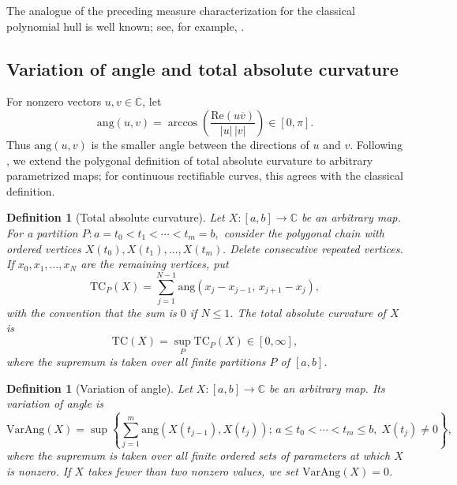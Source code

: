 \documentclass[10pt,a4paper]{amsart}
\newtheorem{definition}[theorem]{Definition}
\newcommand{\C}{\mathbb{C}}
\newcommand{\ang}{\mathrm{ang}}
\newcommand{\T}{\mathrm{TC}}
\newcommand{\VA}{\mathrm{VarAng}}
\newcommand\Real{\mathrm{Re}}
\numberwithin{equation}{section}
\begin{document}
The analogue of the preceding measure characterization for the classical polynomial hull is well known; see, for example, \cite[Section~1.2]{St}. 

\subsection{Variation of angle and total absolute curvature} 

For nonzero vectors $u,v\in\mathbb C$, let
\[\ang(u,v)=\arccos\!\left(
        \frac{\Real(u\overline v)}{|u|\,|v|}\right)\in[0,\pi].\]
Thus $\ang(u,v)$ is the smaller angle between the directions of
$u$ and $v$. Following \cite{M}, we extend the polygonal definition of total absolute curvature to arbitrary parametrized maps; for continuous rectifiable curves, this agrees with the classical definition.
\begin{definition}[Total absolute curvature]\label{D1}
Let $X:[a,b]\to\C$ be an arbitrary map.  For a partition
$P:a=t_0<t_1<\cdots<t_m=b,$
consider the polygonal chain with ordered vertices
$X(t_0),X(t_1),\ldots,X(t_m).$
Delete consecutive repeated vertices.  If $x_0,x_1,\ldots,x_N$
are the remaining vertices, put
\[\T_P(X)=\sum_{j=1}^{N-1}\ang(x_j-x_{j-1},\,x_{j+1}-x_j),\]
with the convention that the sum is $0$ if $N\leq 1$.
The \emph{total absolute curvature} of $X$ is
\[\T(X)=\sup_P \T_P(X)\in[0,\infty],\]
where the supremum is taken over all finite partitions $P$ of $[a,b]$.
\end{definition}

\begin{definition}[Variation of angle]\label{D2}
Let $X:[a,b]\to\mathbb C$ be an arbitrary map.  Its \emph{variation of angle} is
\[\VA(X)=\sup
    \left\{
        \sum_{j=1}^{m}
        \ang\left(X(t_{j-1}),X(t_j)\right);\,
        a\leq t_0<\cdots<t_m\leq b,\;
        X(t_j)\neq 0
    \right\},
\]
where the supremum is taken over all finite ordered sets of
parameters at which $X$ is nonzero.  If $X$ takes fewer than two
nonzero values, we set $\VA(X)=0$.
\end{definition}
\end{document}
